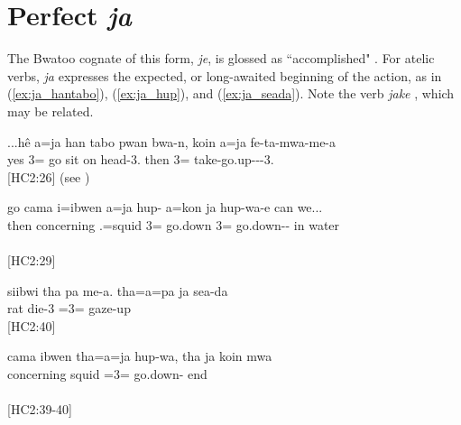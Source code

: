 \section{Perfect \textit{ja} }
\label{sec:ja}
The Bwatoo cognate of this form, \textit{je}, is glossed as ``accomplished" \parencite[56]{rivierre_bwatoo_2006}. For atelic verbs, \textit{ja} expresses the expected, or long-awaited beginning of the action, as in (\ref{ex:ja_hantabo}), (\ref{ex:ja_hup}), and (\ref{ex:ja_seada}). Note the verb \textit{jake} , which may be related.


\ea\label{ex:ja_hantabo}
\gll ...hê a={ja} han tabo pwan bwa-n, koin a={ja} fe-ta-mwa-me-a\\
 yes 3= go sit on head-3. then 3= take-go.up---3.\\
\glt {} {[HC2:26] (see )}
\z

%
%

\ea\label{ex:ja_hup}
\gll go cama i=ibwen a={ja} hup- a=kon {ja} hup-wa-e can we...\\
 then concerning .=squid 3= go.down 3=  go.down-- in water\\
\glt {}\\  {[HC2:29]}
\z

\ea \label{ex:ja_seada}
\gll siibwi tha pa me-a. tha=a=pa {ja} sea-da\\
 rat   die-3 =3=  gaze-up \\
\glt {} {[HC2:40]}
\z

\ea \label{ex:ja_end}
\gll cama ibwen tha=a={ja} hup-wa, tha ja koin mwa \\ %
 concerning squid =3= go.down-   end \\
\glt {}\\
 {[HC2:39-40]}
\z

